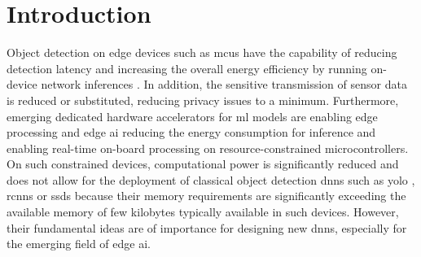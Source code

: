\documentclass[conference]{IEEEtran}
\begin{document}
\section{Introduction}
Object detection on edge devices such as \glspl{mcu} have the capability of reducing detection latency and increasing the overall energy efficiency by running on-device network inferences \cite{dutta_tinyml_2021, boner2022tiny}. In addition, the sensitive transmission of sensor data is reduced or substituted, reducing privacy issues to a minimum. Furthermore, emerging dedicated hardware accelerators for \gls{ml} models are enabling edge processing and edge \gls{ai} reducing the energy consumption for inference and enabling real-time on-board processing on resource-constrained microcontrollers\cite{merenda_edge_2020}. On such constrained devices, computational power is significantly reduced and does not allow for the deployment of classical object detection \glspl{dnn} such as \gls{yolo} \cite{redmon_you_2016}, \glspl{rcnn} \cite{ren_faster_2015} or \glspl{ssd} \cite{liu_ssd_2016} because their memory requirements are significantly exceeding the available memory of few kilobytes typically available in such devices. However, their fundamental ideas are of importance for designing new \glspl{dnn}, especially for the emerging field of edge \gls{ai}.
\end{document}
